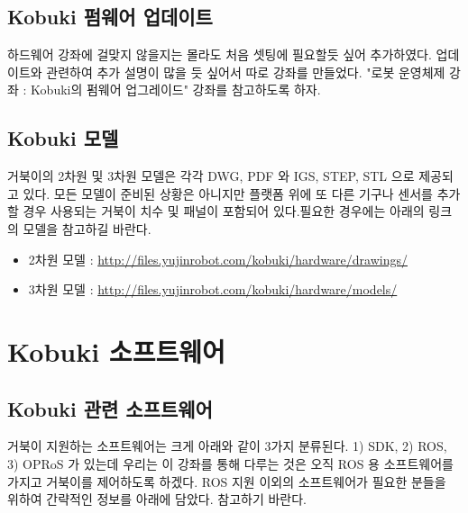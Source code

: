 \subsection{Kobuki 펌웨어 업데이트}

하드웨어 강좌에 걸맞지 않을지는 몰라도 처음 셋팅에 필요할듯 싶어 추가하였다. 업데이트와 관련하여 추가 설명이 많을 듯 싶어서 따로 강좌를 만들었다. "로봇 운영체제 강좌 : Kobuki의 펌웨어 업그레이드" 강좌를 참고하도록 하자.

\subsection{Kobuki 모델}

거북이의 2차원 및 3차원 모델은 각각 DWG, PDF 와 IGS, STEP, STL 으로 제공되고 있다. 모든 모델이 준비된 상황은 아니지만 플랫폼 위에 또 다른 기구나 센서를 추가할 경우 사용되는 거북이 치수 및 패널이 포함되어 있다.필요한 경우에는 아래의 링크의 모델을 참고하길 바란다.

\begin{itemize}[leftmargin=*]
\item 2차원 모델 : \url{http://files.yujinrobot.com/kobuki/hardware/drawings/}
\item 3차원 모델 : \url{http://files.yujinrobot.com/kobuki/hardware/models/}
\end{itemize}

\section{Kobuki 소프트웨어}

\subsection{Kobuki 관련 소프트웨어}

거북이 지원하는 소프트웨어는 크게 아래와 같이 3가지 분류된다. 1) SDK, 2) ROS, 3) OPRoS 가 있는데 우리는 이 강좌를 통해 다루는 것은 오직 ROS 용 소프트웨어를 가지고 거북이를 제어하도록 하겠다. ROS 지원 이외의 소프트웨어가 필요한 분들을 위하여 간략적인 정보를 아래에 담았다. 참고하기 바란다.

